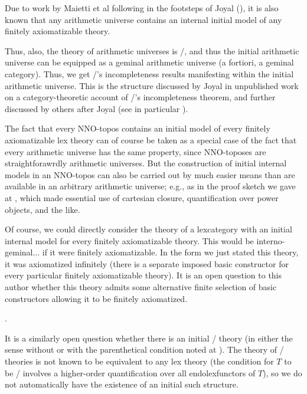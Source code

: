 Due to work by Maietti et al following in the footsteps of Joyal (), it is also known that any arithmetic universe contains an internal initial model of any finitely axiomatizable theory.

Thus, also, the theory of arithmetic universes is \initogeminal/, and thus the initial arithmetic universe can be equipped as a geminal arithmetic universe (a fortiori, a geminal category). Thus, we get \Godel/'s incompleteness results manifesting within the initial arithmetic universe. This is the structure discussed by Joyal in unpublished work on a category-theoretic account of \Godel/'s incompleteness theorem, and further discussed by others after Joyal (see in particular \autocite{van2020g}).

The fact that every NNO-topos contains an initial model of every finitely axiomatizable lex theory can of course be taken as a special case of the fact that every arithmetic universe has the same property, since NNO-toposes are straightforawrdly arithmetic universes. But the construction of initial internal models in an NNO-topos can also be carried out by much easier means than are available in an arbitrary arithmetic universe; e.g., as in the proof sketch we gave at , which made essential use of cartesian closure, quantification over power objects, and the like.

Of course, we could directly consider the theory of a lexcategory with an initial internal model for every finitely axiomatizable theory. This would be interno-geminal... if it were finitely axiomatizable. In the form we just stated this theory, it was axiomatized infinitely (there is a separate imposed basic constructor for every particular finitely axiomatizable theory). It is an open question to this author whether this theory admits some alternative finite selection of basic constructors allowing it to be finitely axiomatized.

.

It is a similarly open question whether there is an initial \initogeminal/ theory (in either the sense without or with the parenthetical condition noted at ). The theory of \initogeminal/ theories is not known to be equivalent to any lex theory (the condition for $T$ to be \initogeminal/ involves a higher-order quantification over all endolexfunctors of $T$), so we do not automatically have the existence of an initial such structure.

